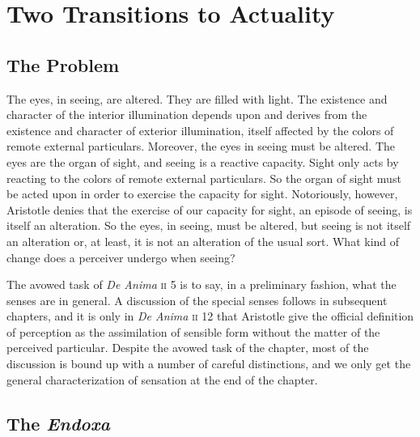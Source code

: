 \chapter{Two Transitions to Actuality} %
\label{cha:two_kinds_of_potentiality}

\section{The Problem} %
\label{sec:the_problem}

The eyes, in seeing, are altered. They are filled with light. The existence and character of the interior illumination depends upon and derives from the existence and character of exterior illumination, itself affected by the colors of remote external particulars. Moreover, the eyes in seeing must be altered. The eyes are the organ of sight, and seeing is a reactive capacity. Sight only acts by reacting to the colors of remote external particulars. So the organ of sight must be acted upon in order to exercise the capacity for sight. Notoriously, however, Aristotle denies that the exercise of our capacity for sight, an episode of seeing, is itself an alteration. So the eyes, in seeing, must be altered, but seeing is not itself an alteration or, at least, it is not an alteration of the usual sort. What kind of change does a perceiver undergo when seeing? 

The avowed task of \emph{De Anima} \textsc{ii} 5 is to say, in a preliminary fashion, what the senses are in general. A discussion of the special senses follows in subsequent chapters, and it is only in \emph{De Anima} \textsc{ii} 12 that Aristotle give the official definition of perception as the assimilation of sensible form without the matter of the perceived particular. Despite the avowed task of the chapter, most of the discussion is bound up with a number of careful distinctions, and we only get the general characterization of sensation at the end of the chapter. 


\section{The \emph{Endoxa}} %
\label{sec:the_endoxa}

